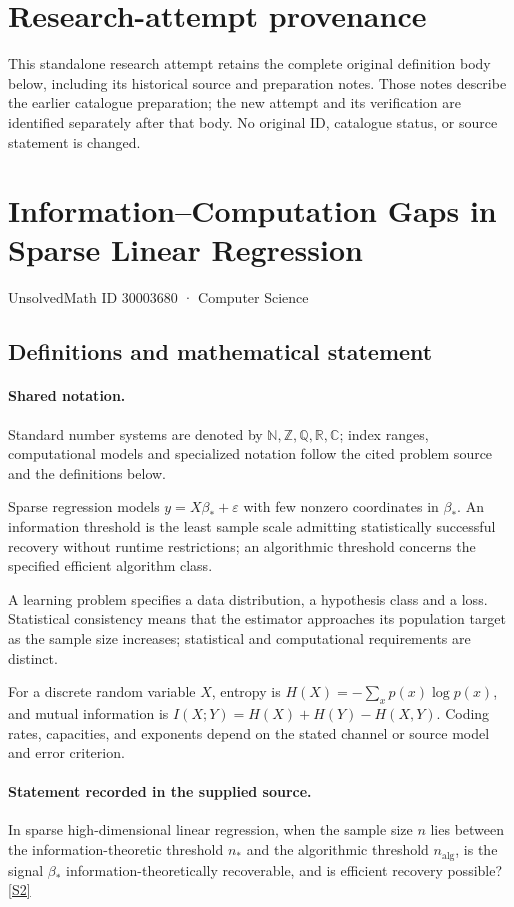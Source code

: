 \documentclass[11pt]{article}
\begin{document}
\section*{Research-attempt provenance}
This standalone research attempt retains the complete original definition body below,
including its historical source and preparation notes. Those notes describe the
earlier catalogue preparation; the new attempt and its verification are identified
separately after that body. No original ID, catalogue status, or source statement is changed.

\section{Information–Computation Gaps in Sparse Linear Regression}\label{30003680}
{\small UnsolvedMath ID 30003680 · Computer Science}
\subsection{Definitions and mathematical statement}

\paragraph{Shared notation.}Standard number systems are denoted by $\mathbb N,\mathbb Z,\mathbb Q,\mathbb R,\mathbb C$; index ranges, computational models and specialized notation follow the cited problem source and the definitions below.


Sparse regression models $y=X\beta_*+\varepsilon$ with few nonzero coordinates in $\beta_*$. An information threshold is the least sample scale admitting statistically successful recovery without runtime restrictions; an algorithmic threshold concerns the specified efficient algorithm class.

A learning problem specifies a data distribution, a hypothesis class and a loss. Statistical consistency means that the estimator approaches its population target as the sample size increases; statistical and computational requirements are distinct.

For a discrete random variable $X$, entropy is $H(X)=-\sum_xp(x)\log p(x)$, and mutual information is $I(X;Y)=H(X)+H(Y)-H(X,Y)$. Coding rates, capacities, and exponents depend on the stated channel or source model and error criterion.
\paragraph{Statement recorded in the supplied source.}
In sparse high-dimensional linear regression, when the sample size $n$ lies between the information-theoretic threshold $n_*$ and the algorithmic threshold $n_{\mathrm{alg}}$, is the signal $\beta_*$ information-theoretically recoverable, and is efficient recovery possible? \href{https://doi.org/10.4171/owr/2017/57}{[S2]}
\end{document}
